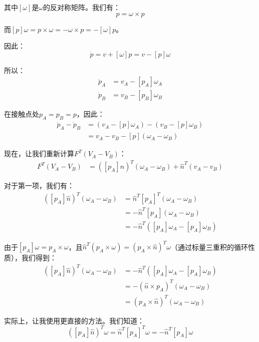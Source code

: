 \documentclass[12pt,a4paper]{article}
\begin{document}
其中$[\omega]$是$\omega$的反对称矩阵。我们有：
\begin{equation}
[\omega] p = \omega \times p
\end{equation}

而$[p] \omega = p \times \omega = -\omega \times p = -[\omega] p$。

因此：
\begin{equation}
\dot{p} = v + [\omega] p = v - [p] \omega
\end{equation}

所以：
\begin{align}
\dot{p}_A &= v_A - [p_A] \omega_A \\
\dot{p}_B &= v_B - [p_B] \omega_B
\end{align}

在接触点处$p_A = p_B = p$，因此：
\begin{align}
\dot{p}_A - \dot{p}_B &= (v_A - [p] \omega_A) - (v_B - [p] \omega_B) \\
&= v_A - v_B - [p] (\omega_A - \omega_B)
\end{align}

现在，让我们重新计算$F^T (V_A - V_B)$：
\begin{align}
F^T (V_A - V_B) &= ([p_A]\hat{n})^T (\omega_A - \omega_B) + \hat{n}^T (v_A - v_B)
\end{align}

对于第一项，我们有：
\begin{align}
([p_A]\hat{n})^T (\omega_A - \omega_B) &= \hat{n}^T [p_A]^T (\omega_A - \omega_B) \\
&= -\hat{n}^T [p_A] (\omega_A - \omega_B) \\
&= -\hat{n}^T ([p_A] \omega_A - [p_A] \omega_B)
\end{align}

由于$[p_A] \omega = p_A \times \omega$，且$\hat{n}^T (p_A \times \omega) = (p_A \times \hat{n})^T \omega$（通过标量三重积的循环性质），我们得到：
\begin{align}
([p_A]\hat{n})^T (\omega_A - \omega_B) &= -\hat{n}^T ([p_A] \omega_A - [p_A] \omega_B) \\
&= -(\hat{n} \times p_A)^T (\omega_A - \omega_B) \\
&= (p_A \times \hat{n})^T (\omega_A - \omega_B)
\end{align}

实际上，让我使用更直接的方法。我们知道：
\begin{equation}
([p_A]\hat{n})^T \omega = \hat{n}^T [p_A]^T \omega = -\hat{n}^T [p_A] \omega
\end{equation}
\end{document}
